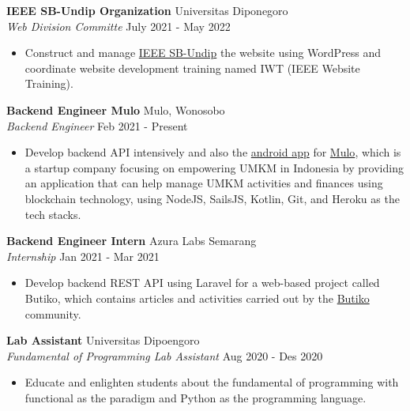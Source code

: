 \documentclass[a4paper]{article}
\begin{document}
\textbf{IEEE SB-Undip Organization} \hfill Universitas Diponegoro\\
\textit{Web Division Committe} \hfill July 2021 - May 2022\\
\vspace{-1mm}
\begin{itemize} \itemsep 1pt
	\item Construct and manage \href{https://edu.ieee.org/id-undip/}{IEEE SB-Undip} the website using WordPress and coordinate website development training named IWT (IEEE Website Training).
\end{itemize}

\textbf{Backend Engineer Mulo} \hfill Mulo, Wonosobo\\
\textit{Backend Engineer} \hfill Feb 2021 - Present\\
\vspace{-1mm}
\begin{itemize} \itemsep 1pt
	\item Develop backend API intensively and also the \href{https://play.google.com/store/apps/details?id=app.mulo}{android app} for \href{https://muloapp.id/}{Mulo}, which is a startup company focusing on empowering UMKM in Indonesia by providing an application that can help manage UMKM activities and finances using blockchain technology, using NodeJS, SailsJS, Kotlin, Git, and Heroku as the tech stacks.
\end{itemize}

\textbf{Backend Engineer Intern} \hfill Azura Labs Semarang\\
\textit{Internship} \hfill Jan 2021 - Mar 2021\\
\vspace{-1mm}
\begin{itemize} \itemsep 1pt
	\item Develop backend REST API using Laravel for a web-based project called \textquotesingle{}Butiko\textquotesingle{}, which contains articles and activities carried out by the \textquotesingle{}\href{https://butiko.id/}{Butiko}\textquotesingle{} community.
\end{itemize}

\textbf{Lab Assistant} \hfill Universitas Dipoengoro\\
\textit{Fundamental of Programming Lab Assistant} \hfill Aug 2020 - Des 2020\\
\vspace{-1mm}
\begin{itemize} \itemsep 1pt
	\item Educate and enlighten students about the fundamental of programming with functional as the paradigm and Python as the programming language.
\end{itemize}
\end{document}
